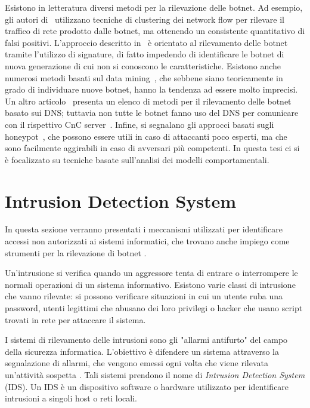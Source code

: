 \documentclass[../main.tex]{subfiles}
\begin{document}
Esistono in letteratura diversi metodi per la rilevazione delle botnet. Ad esempio, gli autori di~\cite{netflowbotnetdetection} utilizzano tecniche di clustering dei network flow per rilevare il traffico di rete prodotto dalle botnet, ma ottenendo un consistente quantitativo di falsi positivi. L'approccio descritto in~\cite{signaturebotnetdetection} è orientato al rilevamento delle botnet tramite l'utilizzo di signature, di fatto impedendo di identificare le botnet di nuova generazione di cui non si conoscono le caratteristiche. Esistono anche numerosi metodi basati sul data mining~\cite{dataminingbotnetdetection}, che sebbene siano teoricamente in grado di individuare nuove botnet, hanno la tendenza ad essere molto imprecisi. Un altro articolo~\cite{dnsbotnetdetection} presenta un elenco di metodi per il rilevamento delle botnet basato sui DNS; tuttavia non tutte le botnet fanno uso del DNS per comunicare con il rispettivo CnC server~\cite{brown2010resilient}. Infine, si segnalano gli approcci basati sugli honeypot~\cite{honeypotbotnetdetection}, che possono essere utili in caso di attaccanti poco esperti, ma che sono facilmente aggirabili in caso di avversari più competenti. In questa tesi ci si è focalizzato su tecniche basate sull'analisi dei modelli comportamentali.


\section{Intrusion Detection System}
In questa sezione verranno presentati i meccanismi utilizzati per identificare accessi non autorizzati ai sistemi informatici, che trovano anche impiego come strumenti per la rilevazione di botnet \cite{botnetdetection}.

Un'intrusione si verifica quando un aggressore tenta di entrare o interrompere le normali operazioni di un sistema informativo\cite{idsbook}. Esistono varie classi di intrusione che vanno rilevate: si possono verificare situazioni in cui un utente ruba una password, utenti legittimi che abusano dei loro privilegi o hacker che usano script trovati in rete per attaccare il sistema.

I sistemi di rilevamento delle intrusioni sono gli "allarmi antifurto" del campo della sicurezza informatica. L'obiettivo è difendere un sistema attraverso la segnalazione di allarmi, che vengono emessi ogni volta che viene rilevata un'attività sospetta \cite{IDS}. Tali sistemi prendono il nome di \textit{Intrusion Detection System} (IDS). Un IDS è un dispositivo software o hardware utilizzato per identificare intrusioni a singoli host o reti locali.
\end{document}
